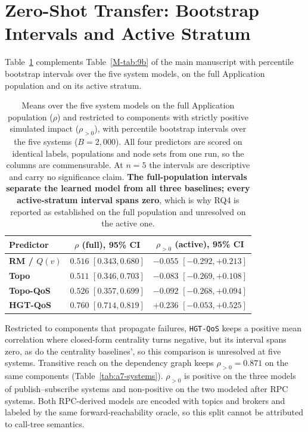 \documentclass[preprint,3p]{elsarticle}
\begin{document}
\section{Zero-Shot Transfer: Bootstrap Intervals and Active Stratum}
\label{supp:transfer-active}

Table~\ref{tab:9c} complements Table~\ref{M-tab:9b} of the main manuscript with percentile bootstrap intervals over the five system models, on the full Application population and on its active stratum.

\begin{table}[htbp]
\centering
\small
\caption{Means over the five system models on the full Application population ($\rho$) and restricted to components with strictly positive simulated impact ($\rho_{>0}$), with percentile bootstrap intervals over the five systems ($B = 2{,}000$). All four predictors are scored on identical labels, populations and node sets from one run, so the columns are commensurable. At $n = 5$ the intervals are descriptive and carry no significance claim. \textbf{The full-population intervals separate the learned model from all three baselines; every active-stratum interval spans zero}, which is why RQ4 is reported as established on the full population and unresolved on the active one.}
\label{tab:9c}
\begin{tabular}{lcc}
\toprule
\textbf{Predictor} & \textbf{$\rho$ (full), 95\% CI} & \textbf{$\rho_{>0}$ (active), 95\% CI} \\
\midrule
\textbf{RM / $Q(v)$} & $0.516$ $[0.343, 0.680]$ & $-0.055$ $[-0.292, +0.213]$ \\
\textbf{Topo} & $0.511$ $[0.346, 0.703]$ & $-0.083$ $[-0.269, +0.108]$ \\
\textbf{Topo-QoS} & $0.526$ $[0.357, 0.699]$ & $-0.092$ $[-0.268, +0.094]$ \\
\textbf{HGT-QoS} & $\mathbf{0.760}$ $[0.714, 0.819]$ & $\mathbf{+0.236}$ $[-0.053, +0.525]$ \\
\bottomrule
\end{tabular}
\end{table}

\noindent Restricted to components that propagate failures, \texttt{HGT-QoS} keeps a positive mean correlation where closed-form centrality turns negative, but its interval spans zero, as do the centrality baselines', so this comparison is unresolved at five systems. Transitive reach on the dependency graph keeps $\rho_{>0} = 0.871$ on the same components (Table~\ref{tab:a7-systems}). $\rho_{>0}$ is positive on the three models of publish--subscribe systems and non-positive on the two modeled after RPC systems. Both RPC-derived models are encoded with topics and brokers and labeled by the same forward-reachability oracle, so this split cannot be attributed to call-tree semantics.
\end{document}
